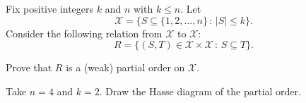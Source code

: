\documentclass[12pt]{article}
\begin{document}
\newpage

\begin{problem}{11}


Fix positive integers $k$ and $n$ with $k \leq n$. Let 
\[ \mathcal{X} = \{ S \subseteq \{1, 2, \ldots, n\} \,:\, |S| \leq k \}. \]
Consider the following relation from $\mathcal{X}$ to $\mathcal{X}$:
\[ R = \{ (S,T) \in \mathcal{X} \times \mathcal{X} \,:\, S \subseteq T \}. \]

\bparts
{} Prove that $R$ is a (weak) partial order on $\mathcal{X}$.
\vspace{8cm}

\newpage

 Take $n=4$ and $k=2$. Draw the Hasse diagram of the partial order.
\eparts

\end{problem}

\newpage
\end{document}
